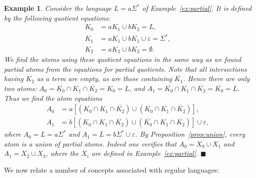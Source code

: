 \documentclass[preprint,12pt]{elsarticle}
\newcommand{\ol}{\overline}
\newcommand{\eps}{\varepsilon}
\newcommand{\emp}{\emptyset}
\newcommand{\Sig}{\Sigma}
\newcommand{\qedb}{\hfill$\blacksquare$}
\newtheorem{example}{Example}
\begin{document}
\begin{example}
\label{ex:atoms1}
Consider the language $L=a\Sig^*$ of Example~\ref{ex:partial}.
It is defined by the following quotient equations:
\begin{displaymath}
 \begin{array}{rl}
   K_0 &= aK_1 \cup b K_2=L, \\
   K_1 &= aK_1\cup bK_1 \cup \eps=\Sig^*, \\
   K_2 &= aK_2\cup bK_2=\emp. 
 \end{array}  
\end{displaymath}  
We find the atoms using these quotient equations in the same way 
as we found partial atoms from the equations for partial quotients. 
Note that all intersections having $K_2$ as a term are empty, 
as are those containing $\ol{K_1}$.
Hence there are only two atoms: 
$A_0=K_0\cap K_1\cap\ol{K_2}=K_0=L$, and
$A_1=\ol{K_0}\cap K_1\cap\ol{K_2}=\ol{K_0}=\ol{L}$. 
Thus we find the atom equations
\begin{displaymath}
 \begin{array}{rl}
  A_0
 &= a[(K_0\cap K_1\cap \ol{K_2}) \cup (\ol{K_0}\cap K_1\cap \ol{K_2})],\\
  A_1&= 
  b[(K_0\cap K_1\cap \ol{K_2}) \cup (\ol{K_0}\cap K_1\cap \ol{K_2})]\cup \eps,
 \end{array}
\end{displaymath}
where $A_0=L=a\Sig^*$ and $A_1=\ol{L}=b\Sig^*\cup \eps$.
By Proposition~\ref{prop:union}, every atom is a union of partial atoms. 
Indeed one verifies that $A_0=X_0\cup X_1$ and  $A_1=X_2\cup X_3$, 
where the $X_i$ are defined in Example~\ref{ex:partial}.
\qedb
\end{example}


We now relate a number of concepts associated with regular languages:
\end{document}
